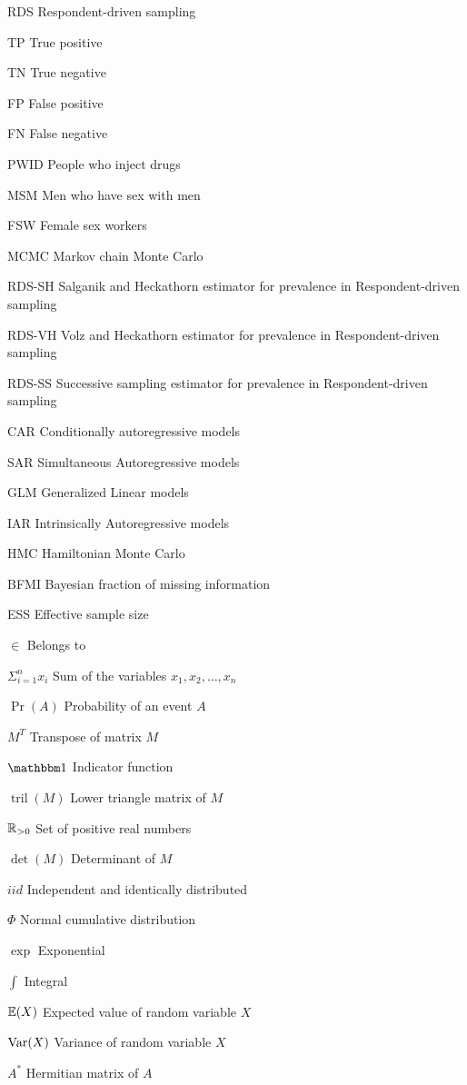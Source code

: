 \begin{siglas}
    \item[RDS] Respondent-driven sampling
    \item[TP] True positive 
    \item[TN] True negative
    \item[FP] False positive
    \item[FN] False negative
    \item[PWID] People who inject drugs
    \item[MSM] Men who have sex with men
    \item[FSW] Female sex workers      
    \item[MCMC] Markov chain Monte Carlo 
    \item[RDS-SH] Salganik and Heckathorn estimator for prevalence in
    Respondent-driven sampling 
    \item[RDS-VH] Volz and Heckathorn estimator for prevalence in
    Respondent-driven sampling
    \item[RDS-SS] Successive sampling estimator for prevalence in
    Respondent-driven sampling 
    \item[CAR] Conditionally autoregressive models
    \item[SAR] Simultaneous Autoregressive models
    \item[GLM] Generalized Linear models  
    \item[IAR] Intrinsically Autoregressive models
    \item[HMC] Hamiltonian Monte Carlo
    \item[BFMI] Bayesian fraction of missing information  
    \item[ESS] Effective sample size 
  \end{siglas}
  
  \begin{simbolos}
    \item[$\in$] Belongs to 
    \item[$\Sigma_{i=1}^n x_i$] Sum of the variables $x_1, x_2, \dots, x_n$
    \item[$\Pr(A)$] Probability of an event $A$
    \item[$M^T$] Transpose of matrix $M$
    \item[$\ind$] Indicator function 
    \item[$\operatorname{tril}(M)$] Lower triangle matrix of $M$
    \item[$\mathbb{R}_{>0}$] Set of positive real numbers
    \item[$\det(M)$] Determinant of $M$ 
    \item[$iid$] Independent and identically distributed
    \item[$\Phi$] Normal cumulative distribution
    \item[$\exp$] Exponential  
    \item[$\int$] Integral 
    \item[$\mathbb{E}(X)$] Expected value of random variable $X$ 
    \item[$\operatorname{Var}(X)$] Variance of random variable $X$
    \item[$A^*$] Hermitian matrix of $A$ 
  \end{simbolos}
